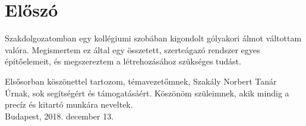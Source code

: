 \documentclass[../main.tex]{subfiles}
\begin{document}
\section*{Előszó}


Szakdolgozatomban egy kollégiumi szobában kigondolt gólyakori álmot váltottam valóra. Megismertem ez által egy összetett, szerteágazó rendszer egyes építőelemeit, és megszereztem a létrehozásához szükséges tudást. 

\vspace{2cm}

Elsősorban köszönettel tartozom, témavezetőmnek, Szakály Norbert Tanár Úrnak, sok segítségért és támogatásáért.
Köszönöm szüleimnek, akik mindig a precíz és kitartó munkára neveltek.\\[5mm]

Budapest, 2018. december 13. \\[5mm]

{\hspace{0.7\textwidth} \itshape \myname}
\end{document}
